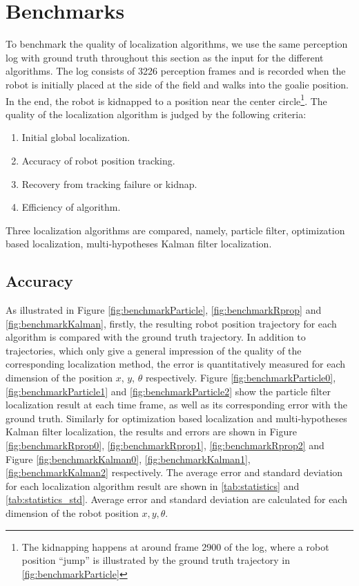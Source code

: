 \section{Benchmarks}
\label{sec:Benchmark}
To benchmark the quality of localization algorithms, we use the same perception log with ground truth throughout this section as the input for the different algorithms. The log consists of 3226 perception frames and is recorded when the robot is initially placed at the side of the field and walks into the goalie position. In the end, the robot is kidnapped to a position near the center circle\footnote{The kidnapping happens at around frame 2900 of the log, where a robot position ``jump'' is illustrated by the ground truth trajectory in \autoref{fig:benchmarkParticle}}. The quality of the localization algorithm is judged by the following criteria: 
\begin{enumerate}
  \item Initial global localization.
  \item Accuracy of robot position tracking.
  \item Recovery from tracking failure or kidnap.
  \item Efficiency of algorithm.
\end{enumerate}

Three localization algorithms are compared, namely, particle filter, optimization based localization, multi-hypotheses Kalman filter localization.

\subsection{Accuracy}
\label{sub:Accuracy}
As illustrated in Figure \ref{fig:benchmarkParticle}, \ref{fig:benchmarkRprop} and \ref{fig:benchmarkKalman}, firstly, the resulting robot position trajectory for each algorithm is compared with the ground truth trajectory. In addition to trajectories, which only give a general impression of the quality of the corresponding localization method, the error is quantitatively measured for each dimension of the position $x$, $y$, $\theta$ respectively. 
Figure \ref{fig:benchmarkParticle0}, \ref{fig:benchmarkParticle1} and \ref{fig:benchmarkParticle2} show the particle filter localization result at each time frame, as well as its corresponding error with the ground truth. Similarly for optimization based localization and multi-hypotheses Kalman filter localization,  the results and errors are shown in Figure \ref{fig:benchmarkRprop0}, \ref{fig:benchmarkRprop1}, \ref{fig:benchmarkRprop2} and Figure \ref{fig:benchmarkKalman0},  \ref{fig:benchmarkKalman1}, \ref{fig:benchmarkKalman2} respectively. The average error and standard deviation for each localization algorithm result are shown in \autoref{tab:statistics} and \ref{tab:statistics_std}. Average error and standard deviation are calculated for each dimension of the robot position $x, y, \theta$.



